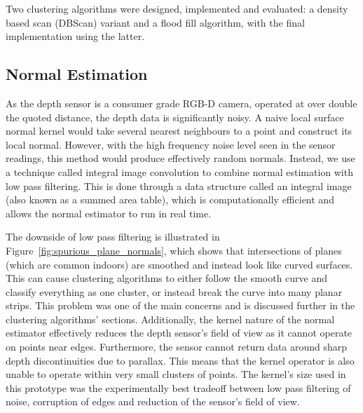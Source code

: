 \documentclass[]{article}
\begin{document}
{Two clustering algorithms were designed, implemented and evaluated: a density based scan (DBScan) variant and a flood fill algorithm, with the final implementation using the latter.
\subsection{Normal Estimation} %
\label{sub:normal_estimation}

As the depth sensor is a consumer grade RGB-D camera, operated at over double the quoted distance, the depth data is significantly noisy. A naive local surface normal kernel would take several nearest neighbours to a point and construct its local normal. However, with the high frequency noise level seen in the sensor readings, this method would produce effectively random normals. Instead, we use a technique called integral image convolution \cite{Holz2011} to combine normal estimation with low pass filtering. This is done through a data structure called an integral image (also known as a summed area table), which is computationally efficient and allows the normal estimator to run in real time. 

The downside of low pass filtering is illustrated in Figure~\ref{fig:spurious_plane_normals}, which shows that intersections of planes (which are common indoors) are smoothed and instead look like curved surfaces. This can cause clustering algorithms to either follow the smooth curve and classify everything as one cluster, or instead break the curve into many planar strips. This problem was one of the main concerns and is discussed further in the clustering algorithms' sections. Additionally, the kernel nature of the normal estimator effectively reduces the depth sensor's field of view as it cannot operate on points near edges. Furthermore, the sensor cannot return data around sharp depth discontinuities due to parallax. This means that the kernel operator is also unable to operate within very small clusters of points. The kernel's size used in this prototype was the experimentally best tradeoff between low pass filtering of noise, corruption of edges and reduction of the sensor's field of view.

}
\end{document}
